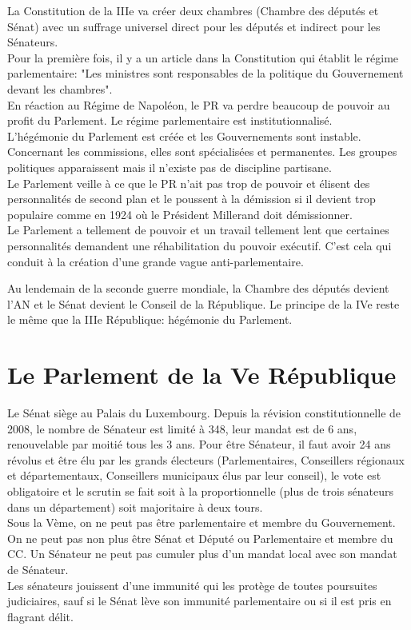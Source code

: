 \documentclass[12pt, a4paper, openany]{book}
\begin{document}
La Constitution de la IIIe va créer deux chambres (Chambre des députés et Sénat) avec un suffrage universel direct pour les députés et indirect pour les Sénateurs. \\
Pour la première fois, il y a un article dans la Constitution qui établit le régime parlementaire: "Les ministres sont responsables de la politique du Gouvernement devant les chambres". \\
En réaction au Régime de Napoléon, le PR va perdre beaucoup de pouvoir au profit du Parlement. Le régime parlementaire est institutionnalisé. \\
L'hégémonie du Parlement est créée et les Gouvernements sont instable. \\
Concernant les commissions, elles sont spécialisées et permanentes. Les groupes politiques apparaissent mais il n'existe pas de discipline partisane. \\
Le Parlement veille à ce que le PR n'ait pas trop de pouvoir et élisent des personnalités de second plan et le poussent à la démission si il devient trop populaire comme en 1924 où le Président Millerand doit démissionner. \\
Le Parlement a tellement de pouvoir et un travail tellement lent que certaines personnalités demandent une réhabilitation du pouvoir exécutif. C'est cela qui conduit à la création d'une grande vague anti-parlementaire.


Au lendemain de la seconde guerre mondiale, la Chambre des députés devient l'AN et le Sénat devient le Conseil de la République. Le principe de la IVe reste le même que la IIIe République: hégémonie du Parlement. 


\section{Le Parlement de la Ve République}

Le Sénat siège au Palais du Luxembourg. Depuis la révision constitutionnelle de 2008, le nombre de Sénateur est limité à 348, leur mandat est de 6 ans, renouvelable par moitié tous les 3 ans. Pour être Sénateur, il faut avoir 24 ans révolus et être élu par les grands électeurs (Parlementaires, Conseillers régionaux et départementaux, Conseillers municipaux élus par leur conseil), le vote est obligatoire et le scrutin se fait soit à la proportionnelle (plus de trois sénateurs dans un département) soit majoritaire à deux tours. \\
Sous la Vème, on ne peut pas être parlementaire et membre du Gouvernement. On ne peut pas non plus être Sénat et Député ou Parlementaire et membre du CC. Un Sénateur ne peut pas cumuler plus d'un mandat local avec son mandat de Sénateur. \\
Les sénateurs jouissent d'une immunité qui les protège de toutes poursuites judiciaires, sauf si le Sénat lève son immunité parlementaire ou si il est pris en flagrant délit.
\end{document}
